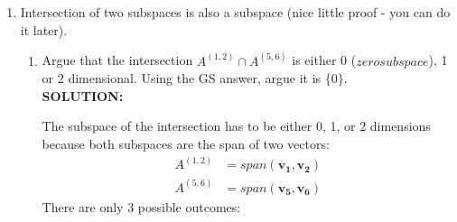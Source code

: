 \documentclass[12pt]{article}
\begin{document}
\begin{enumerate}
\begin{enumerate}
                    Yes, the union of the two subspaces would span the set $V-W$.
                    This is because if you define \(\mathbf{x} \in{} (V-W)\), it is also in (V+W) because V+W = V-W. We also define arbritary vectors:
                    \begin{align*}
                        \mathbf{v} & = \sum_{i=1}^l(\mathbf{v}\cdot{} \mathbf{u_i})\mathbf{u_i} \in{V} \\
                        \mathbf{w} & = \sum_{j=1}^m(\mathbf{w}\cdot{} \mathbf{u_j})\mathbf{u_j} \in{W}
                    \end{align*}
                    Because \(\mathbf{x} \in{(V+W)}\), this means it can also be written as:
                    \begin{align*}
                        \mathbf{x} & = \mathbf{v} + \mathbf{w}                                                                                             \\
                                   & = \sum_{i=1}^l(\mathbf{v}\cdot{} \mathbf{u_i})\mathbf{u_i} + \sum_{j=1}^m(\mathbf{w}\cdot{} \mathbf{u_j})\mathbf{u_j} \\
                                   & = \sum_{k=1}^{l+m}(\mathbf{x}\cdot{} \mathbf{u_k})\mathbf{u_k}
                    \end{align*}

                    However, if the two subspaces aren't orthogonal complements, the union will not produce a orthonomal set.
                    This is because some of the unit vectors will be in the span of each other since the subspaces aren't orthogonal. \\

                    To fix this, all you have to do is apply the Gram–Schmidt algorthim on the union of the two old ONB to produce a new ONB for V-W.
          \end{enumerate}
    \item{} Intersection of two subspaces is also a subspace (nice little proof - you can do it later).
          \begin{enumerate}
              \item{} Argue that the intersection $A^{(1,2)} \cap A^{(5,6)}$ is either 0 ($zerosubspace$), 1 or 2 dimensional. Using the GS answer, argue it is $\{0\}$. \\

                    \textbf{SOLUTION:}

                    The subspace of the intersection has to be either 0, 1, or 2 dimensions because both subspaces are the span of two vectors:
                    \begin{align*}
                        A^{(1,2)} & = span(\mathbf{v_1}, \mathbf{v_2}) \\
                        A^{(5,6)} & = span(\mathbf{v_5}, \mathbf{v_6})
                    \end{align*}
                    There are only 3 possible outcomes:


\end{enumerate}
\end{enumerate}
\end{document}
